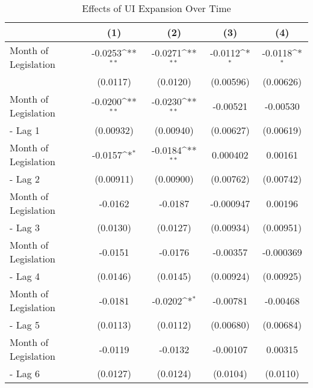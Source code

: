 \begin{table}[htbp]\centering
\scriptsize
\def\sym#1{\ifmmode^{#1}\else\(^{#1}\)\fi}
\caption{Effects of UI Expansion Over Time \label{tab:impulsereponsetable}}
\begin{tabular}{l*{4}{c}}
\hline\hline
                    &\multicolumn{1}{c}{(1)}         &\multicolumn{1}{c}{(2)}         &\multicolumn{1}{c}{(3)}         &\multicolumn{1}{c}{(4)}         \\
\hline
Month of Legislation&     -0.0253\sym{**} &     -0.0271\sym{**} &     -0.0112\sym{*}  &     -0.0118\sym{*}  \\
                    &    (0.0117)         &    (0.0120)         &   (0.00596)         &   (0.00626)         \\
[1em]
Month of Legislation&     -0.0200\sym{**} &     -0.0230\sym{**} &    -0.00521         &    -0.00530         \\
- Lag 1             &   (0.00932)         &   (0.00940)         &   (0.00627)         &   (0.00619)         \\
[1em]
Month of Legislation&     -0.0157\sym{*}  &     -0.0184\sym{**} &    0.000402         &     0.00161         \\
- Lag 2             &   (0.00911)         &   (0.00900)         &   (0.00762)         &   (0.00742)         \\
[1em]
Month of Legislation&     -0.0162         &     -0.0187         &   -0.000947         &     0.00196         \\
- Lag 3             &    (0.0130)         &    (0.0127)         &   (0.00934)         &   (0.00951)         \\
[1em]
Month of Legislation&     -0.0151         &     -0.0176         &    -0.00357         &   -0.000369         \\
- Lag 4             &    (0.0146)         &    (0.0145)         &   (0.00924)         &   (0.00925)         \\
[1em]
Month of Legislation&     -0.0181         &     -0.0202\sym{*}  &    -0.00781         &    -0.00468         \\
- Lag 5             &    (0.0113)         &    (0.0112)         &   (0.00680)         &   (0.00684)         \\
[1em]
Month of Legislation&     -0.0119         &     -0.0132         &    -0.00107         &     0.00315         \\
- Lag 6             &    (0.0127)         &    (0.0124)         &    (0.0104)         &    (0.0110)         \\

\end{tabular}
\end{table}
